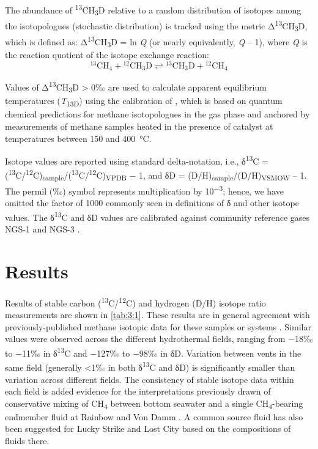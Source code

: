 The abundance of \textsuperscript{13}CH\textsubscript{3}D relative to a
random distribution of isotopes among the isotopologues (stochastic
distribution) is tracked using the metric
Δ\textsuperscript{13}CH\textsubscript{3}D, which is defined as:
Δ\textsuperscript{13}CH\textsubscript{3}D = ln \emph{Q} (or nearly
equivalently, \emph{Q} -- 1), where \emph{Q} is the reaction quotient of
the isotope exchange reaction:
\begin{equation}\label{eqn:3:1}
{}^{13}\text{CH}_4+ {}^{12}{\text{CH}}_3\text{D}\rightleftharpoons {}^{13}{\text{CH}}_3\text{D}+ {}^{12}{\text{CH}}_4
\end{equation}

Values of Δ\textsuperscript{13}CH\textsubscript{3}D \textgreater{} 0‰
are used to calculate apparent equilibrium temperatures
(\emph{T}\textsubscript{13D}) using the calibration of \textcite{Wang++_2015_S}, which is based on quantum chemical predictions for methane
isotopologues in the gas phase and anchored by measurements of methane
samples heated in the presence of catalyst at temperatures between 150 and 400~°C.



Isotope values are reported using standard delta-notation, i.e.,
δ\textsuperscript{13}C =
(\textsuperscript{13}C/\textsuperscript{12}C)\textsubscript{sample}/(\textsuperscript{13}C/\textsuperscript{12}C)\textsubscript{VPDB}
$-$ 1, and δD = (D/H)\textsubscript{sample}/(D/H)\textsubscript{VSMOW} --
1. The permil (‰) symbol represents multiplication by
10\textsuperscript{$-$3}; hence, we have omitted the factor of 1000
commonly seen in definitions of δ and other isotope values. The
δ\textsuperscript{13}C and δD values are calibrated against community
reference gases NGS-1 and NGS-3 \parencite{Wang++_2015_S}.

\section{Results}\label{sec:3:results}

Results of stable carbon (\textsuperscript{13}C/\textsuperscript{12}C)
and hydrogen (D/H) isotope ratio measurements are shown in \autoref{tab:3:1}.
These results are in general agreement with previously-published methane
isotopic data for these samples or systems \parencite{Proskurowski++_2008_S,Charlou++_2010,Pester++_2012_GCA,McDermott++_2015_PNAS}.
Similar values were observed across the different hydrothermal fields,
ranging from $-$18‰ to $-$11‰ in δ\textsuperscript{13}C and $-$127‰ to $-$98‰ in
δD. Variation between vents in the same field (generally \textless{}1‰
in both δ\textsuperscript{13}C and δD) is significantly smaller than
variation across different fields. The consistency of stable isotope
data within each field is added evidence for the interpretations
previously drawn of conservative mixing of CH\textsubscript{4} between
bottom seawater and a single CH\textsubscript{4}-bearing endmember fluid
at Rainbow \parencite{Charlou++_2002_CG} and Von Damm \parencite{McDermott++_2015_PNAS}.
A common source fluid has also been suggested for Lucky Strike \parencite{Pester++_2012_GCA} and Lost City \parencite{Seyfried++_2015_GCA} based on the
compositions of fluids there.

